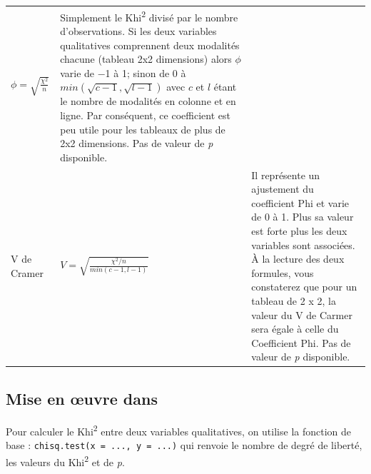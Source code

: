 \documentclass[
  11pt,
  french,
]{book}
\makeatletter
\newenvironment{Shaded}{\begin{snugshade}}{\end{snugshade}}
\newcommand{\CommentTok}[1]{\textcolor[rgb]{0.56,0.35,0.01}{\textit{#1}}}
\newcommand{\DataTypeTok}[1]{\textcolor[rgb]{0.13,0.29,0.53}{#1}}
\newcommand{\KeywordTok}[1]{\textcolor[rgb]{0.13,0.29,0.53}{\textbf{#1}}}
\newcommand{\NormalTok}[1]{#1}
\newcommand{\OperatorTok}[1]{\textcolor[rgb]{0.81,0.36,0.00}{\textbf{#1}}}
\newcommand{\StringTok}[1]{\textcolor[rgb]{0.31,0.60,0.02}{#1}}
\newenvironment{kframe}{%
\medskip{}
\setlength{\fboxsep}{.8em}
 \def\at@end@of@kframe{}%
 \ifinner\ifhmode%
  \def\at@end@of@kframe{\end{minipage}}%
  \begin{minipage}{\columnwidth}%
 \fi\fi%
 \def\FrameCommand##1{\hskip\@totalleftmargin \hskip-\fboxsep
 \colorbox{shadecolor}{##1}\hskip-\fboxsep
     \hskip-\linewidth \hskip-\@totalleftmargin \hskip\columnwidth}%
 \MakeFramed {\advance\hsize-\width
   \@totalleftmargin\z@ \linewidth\hsize
   \@setminipage}}%
 {\par\unskip\endMakeFramed%
 \at@end@of@kframe}
\newenvironment{kframev}{%
\medskip{}
\setlength{\fboxsep}{.8em}
 \def\at@end@of@kframev{}%
 \ifinner\ifhmode%
  \def\at@end@of@kframev{\end{minipage}}%
  \begin{minipage}{\columnwidth}%
 \fi\fi%
 \def\FrameCommand##1{\hskip\@totalleftmargin \hskip-\fboxsep
 \colorbox{shadebluecolor}{##1}\hskip-\fboxsep
     \hskip-\linewidth \hskip-\@totalleftmargin \hskip\columnwidth}%
 \MakeFramed {\advance\hsize-\width
   \@totalleftmargin\z@ \linewidth\hsize
   \@setminipage}}%
 {\par\unskip\endMakeFramed%
 \at@end@of@kframev}
\renewenvironment{Shaded}{\begin{kframe}}{\end{kframe}}
\newenvironment{rmdblock}[1]
  {
  \begin{itemize}
  \renewcommand{\labelitemi}{
    \raisebox{-.7\height}[0pt][0pt]{
      {\setkeys{Gin}{width=3em,keepaspectratio}\texttt{[image: images/\#1]}}
    }
  }
  \setlength{\fboxsep}{1em}
  \begin{kframev}
  \small
  \item
  }
  {
  \end{kframev}
  \end{itemize}
  }
\newenvironment{bloc_aller_loin}
  {\begin{rmdblock}{aller_loin}}
  {\end{rmdblock}}
\makeatother
\begin{document}
\begin{bloc_aller_loin}
\begin{longtable}[]{@{}lll@{}}
\begin{minipage}[t]{0.15\columnwidth}
\(\phi=\sqrt{\frac{\chi^2}{n}}\)\strut
\end{minipage} & \begin{minipage}[t]{0.60\columnwidth}\raggedright
Simplement le Khi\textsuperscript{2} divisé par le nombre d'observations. Si les deux variables qualitatives comprennent deux modalités chacune (tableau 2x2 dimensions) alors \(\phi\) varie de −1 à 1; sinon de 0 à \(min(\sqrt{c-1}, \sqrt{l-1})\) avec \(c\) et \(l\) étant le nombre de modalités en colonne et en ligne. Par conséquent, ce coefficient est peu utile pour les tableaux de plus de 2x2 dimensions. Pas de valeur de \emph{p} disponible.\strut
\end{minipage}\tabularnewline
\begin{minipage}[t]{0.17\columnwidth}\raggedright
V de Cramer\strut
\end{minipage} & \begin{minipage}[t]{0.15\columnwidth}\raggedright
\(V=\sqrt{\frac{\chi^2/n}{min(c-1,l-1)}}\)\strut
\end{minipage} & \begin{minipage}[t]{0.60\columnwidth}\raggedright
Il représente un ajustement du coefficient Phi et varie de 0 à 1. Plus sa valeur est forte plus les deux variables sont associées. À la lecture des deux formules, vous constaterez que pour un tableau de 2 x 2, la valeur du V de Carmer sera égale à celle du Coefficient Phi. Pas de valeur de \emph{p} disponible.\strut
\end{minipage}\tabularnewline
\bottomrule
\end{longtable}

\end{bloc_aller_loin}

\hypertarget{sect0423}{%
\subsection{Mise en œuvre dans}\label{sect0423}}

Pour calculer le Khi\textsuperscript{2} entre deux variables qualitatives, on utilise la fonction de base : \texttt{chisq.test(x\ =\ ...,\ y\ =\ ...)} qui renvoie le nombre de degré de liberté, les valeurs du Khi\textsuperscript{2} et de \emph{p}.

\begin{Shaded}
\end{Shaded}
\end{document}
